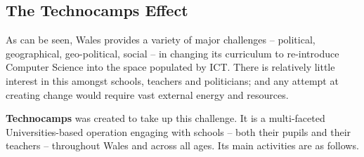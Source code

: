 \documentclass{sig-alternate}
\begin{document}
\subsection{The Technocamps Effect}

As can be seen, Wales provides a variety of major challenges
-- political, geographical, geo-political, social --
in changing its curriculum to re-introduce Computer Science
into the space populated by ICT.
There is relatively little interest in this
amongst schools, teachers and politicians;
and any attempt at creating change would require
vast external energy and resources.

\textbf{Technocamps} was created to take up this challenge.
It is a multi-faceted Universities-based
operation engaging with schools -- both their pupils and their teachers --
throughout Wales and across all ages. Its main activities are as follows.
\end{document}
